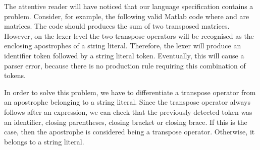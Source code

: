 The attentive reader will have noticed that our language specification contains a problem.
Consider, for example, the following valid Matlab code  where  and  are matrices.
The code should produces the sum of two transposed matrices.
However, on the lexer level the two transpose operators will be recognised as the enclosing apostrophes of a string literal.
Therefore, the lexer will produce an identifier token followed by a string literal token.
Eventually, this will cause a parser error, because there is no production rule requiring this combination of tokens.

In order to solve this problem, we have to differentiate a transpose operator from an apostrophe belonging to a string literal.
Since the transpose operator always follows after an expression, we can check that the previously detected token was an identifier, closing parentheses, closing bracket or closing brace.
If this is the case, then the apostrophe is considered being a transpose operator.
Otherwise, it belongs to a string literal.